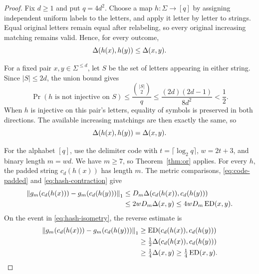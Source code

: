 \begin{proof}
Fix $d\ge1$ and put $q=4d^2$. Choose a map
$h:\Sigma\to[q]$ by assigning independent uniform labels to the letters,
and apply it letter by letter to strings. Equal original letters remain
equal after relabeling, so every original increasing matching remains
valid. Hence, for every outcome,
\begin{equation}\label{eq:hash-contraction}
 \Delta(h(x),h(y))\le\Delta(x,y).
\end{equation}

For a fixed pair $x,y\in\Sigma^{\le d}$, let $S$ be the set of letters
appearing in either string. Since $|S|\le2d$, the union bound gives
\begin{equation}\label{eq:hash-collision}
 \Pr(h\text{ is not injective on }S)
 \le\frac{\binom{|S|}{2}}q
 \le\frac{(2d)(2d-1)}{8d^2}<\frac12.
\end{equation}
When $h$ is injective on this pair's letters, equality of symbols is
preserved in both directions. The available increasing matchings are
then exactly the same, so
\begin{equation}\label{eq:hash-isometry}
 \Delta(h(x),h(y))=\Delta(x,y).
\end{equation}

For the alphabet $[q]$, use the delimiter code with
$t=\lceil\log_2q\rceil$, $w=2t+3$, and binary length $m=wd$.
We have $m\ge7$, so Theorem~\ref{thm:or} applies. For every $h$, the
padded string $c_d(h(x))$ has length $m$. The metric comparisons,
\eqref{eq:code-padded} and \eqref{eq:hash-contraction} give
\begin{align}
 \left\lVert g_m(c_d(h(x)))-g_m(c_d(h(y)))\right\rVert_1
 &\le D_m\Delta(c_d(h(x)),c_d(h(y)))\notag\\
 &\le2wD_m\Delta(x,y)\le4wD_m\operatorname{ED}(x,y).
 \label{eq:outcome-upper}
\end{align}
On the event in \eqref{eq:hash-isometry}, the reverse estimate is
\begin{align}
 \left\lVert g_m(c_d(h(x)))-g_m(c_d(h(y)))\right\rVert_1
 &\ge\operatorname{ED}(c_d(h(x)),c_d(h(y)))\notag\\
 &\ge\tfrac12\Delta(c_d(h(x)),c_d(h(y)))\notag\\
 &\ge\tfrac14\Delta(x,y)\ge\tfrac14\operatorname{ED}(x,y).
 \label{eq:outcome-lower}
\end{align}


\end{proof}
